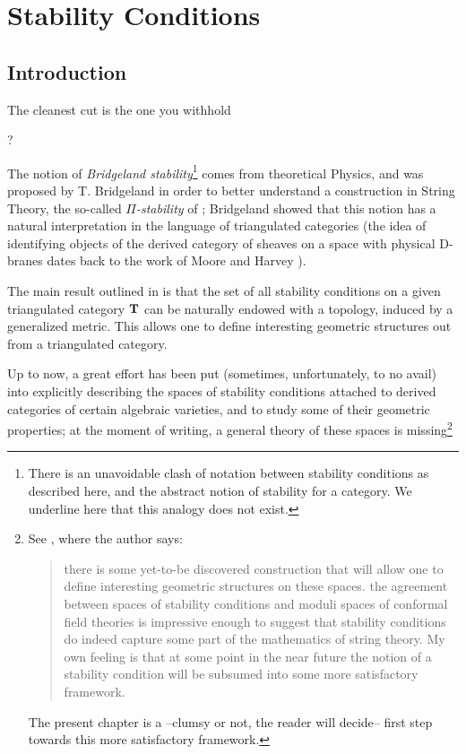\chapter{Stability Conditions}\label{chap:stabilities}
\thispagestyle{empty}
\def\semi{\angle\!}
\newcommand{\thin}{\asymp}
\def\cab{\CC_{[a,b)}}
\def\R{\mathbb{R}}
\def\eps{\varepsilon}
\def\sl{\text{\japanese{切}}}
\section{Introduction}
\epigraph{The cleanest cut is the one you withhold}{?}
The notion of \emph{Bridgeland stability}\footnote{There is an unavoidable clash of notation between stability conditions as described here, and the abstract notion of stability for a category. We underline here that this analogy does not exist.} comes from theoretical Physics, and was proposed by T\@. Bridgeland in order to better understand a construction in String Theory, the so\hyp{}called \emph{$\Pi$\hyp{}stability} of \cite{douglas2002dirichlet,douglas2001d}; Bridgeland showed that this notion has a natural interpretation in the language of triangulated categories (the idea of identifying objects of the derived category of sheaves on a space with physical D\hyp{}branes dates back to the work of Moore and Harvey \cite{harvey1998algebras}). 

The main result outlined in \cite{Brid,Bridge2} is that the set of all stability conditions on a given triangulated category $\textbf{T}$ can be naturally endowed with a topology, induced by a generalized metric. This allows one to define interesting geometric structures out from a triangulated category.

Up to now, a great effort has been put (sometimes, unfortunately, to no avail) into explicitly describing the spaces of stability conditions attached to derived categories of certain algebraic varieties, and to study some of their geometric properties; at the moment of writing, a general theory of these spaces is missing\footnote{See \cite{Bridge2}, where the author says:
\begin{quote}
there is some yet\hyp{}to\hyp{}be discovered construction that will allow one to define interesting geometric structures on these spaces. \omissis the agreement between spaces of stability conditions and moduli spaces of conformal field theories is impressive enough to suggest that stability conditions do indeed capture some part
of the mathematics of string theory. My own feeling is that at some point in the near future the notion of a stability condition will be subsumed into some more satisfactory framework.
\end{quote}
The present chapter is a --clumsy or not, the reader will decide-- first step towards this more satisfactory framework.}

